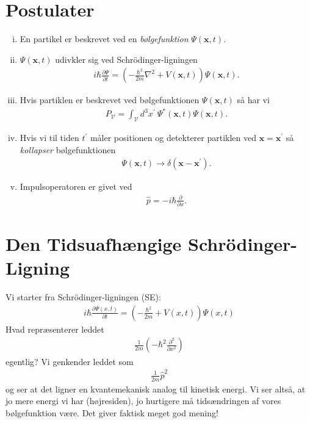 \section{Postulater}
\begin{enumerate}[i)]
    \item En partikel er beskrevet ved en \textit{bølgefunktion} \(\Psi (\mathbf{x}, t)\).
    \item \(\Psi (\mathbf{x}, t)\) udivkler sig ved Schrödinger-ligningen \begin{align*}
        \boxed{i \hbar \frac{\partial \Psi }{\partial t} = \left(  - \frac{\hbar ^{2} }{2m} \nabla^{2}  + V(\mathbf{x}, t) \right) \Psi (\mathbf{x},t).}   
    \end{align*}
    \item Hvis partiklen er beskrevet ved bølgefunktionen \(\Psi (\mathbf{x}, t)\) så har vi \begin{align*}
        \boxed{P_{\mathcal{V} } = \int_{\mathcal{V}}  d^3 x^{\prime}\  \Psi^{\ast} (\mathbf{x},t) \Psi (\mathbf{x} ,t).}
    \end{align*}
    \item Hvis vi til tiden \(t^{\prime} \) måler positionen og detekterer partiklen ved \(\mathbf{x} = \mathbf{x}^{\prime}\) så \textit{kollapser} bølgefunktionen \begin{align*}
        \boxed{\Psi (\mathbf{x}, t) \longrightarrow \delta (\mathbf{x} - \mathbf{x}^{\prime} ).}
    \end{align*}   
    \item Impulsoperatoren er givet ved \begin{align*}
        \boxed{\hat{p} = -i \hbar \frac{\partial}{\partial x}.}
    \end{align*}
\end{enumerate}

\section{Den Tidsuafhængige Schrödinger-Ligning}
Vi starter fra Schrödinger-ligningen (SE): \begin{align*}
    i \hbar \frac{\partial \Psi (x, t)}{\partial t} = \left( - \frac{\hbar ^{2} }{2m} + V(x, t)  \right) \Psi (x, t)
\end{align*}
Hvad repræsenterer leddet \begin{align*}
    \frac{1}{2m}\left( -\hbar ^{2} \frac{\partial^{2} }{\partial x^{2} }  \right) 
\end{align*}
egentlig? Vi genkender leddet som \begin{align*}
    \frac{1}{2m} \hat{p}^{2} 
\end{align*}
og ser at det ligner en kvantemekanisk analog til kinetisk energi. Vi ser altså, at jo mere energi vi har (højresiden), jo hurtigere må tidsændringen af vores bølgefunktion være. Det giver faktisk meget god mening!

